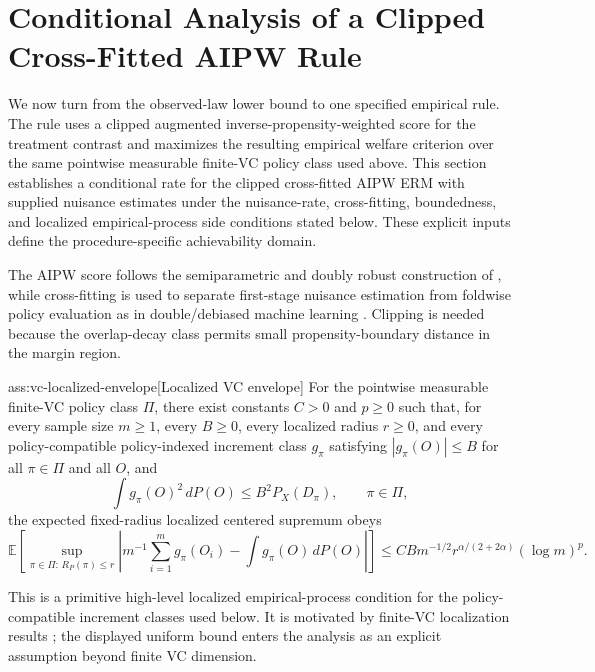 \section{Conditional Analysis of a Clipped Cross-Fitted AIPW Rule}

We now turn from the observed-law lower bound to one specified empirical rule.  The rule uses a clipped augmented inverse-propensity-weighted score for the treatment contrast and maximizes the resulting empirical welfare criterion over the same pointwise measurable finite-VC policy class used above.  This section establishes a conditional rate for the clipped cross-fitted AIPW ERM with supplied nuisance estimates under the nuisance-rate, cross-fitting, boundedness, and localized empirical-process side conditions stated below.  These explicit inputs define the procedure-specific achievability domain.

The AIPW score follows the semiparametric and doubly robust construction of \citet{Robins1994,Hahn1998,Hirano2003,VanDerLaan2011}, while cross-fitting is used to separate first-stage nuisance estimation from foldwise policy evaluation as in double/debiased machine learning \citep{Chernozhukov2018,Chernozhukov2022}.  Clipping is needed because the overlap-decay class permits small propensity-boundary distance in the margin region.

\begin{assumptionv}{ass:vc-localized-envelope}[Localized VC envelope]
For the pointwise measurable finite-VC policy class \(\Pi\), there exist constants \(C>0\) and \(p\ge0\) such that, for every sample size \(m\ge1\), every \(B\ge0\), every localized radius \(r\ge0\), and every policy-compatible policy-indexed increment class \(g_\pi\) satisfying \(|g_\pi(O)|\le B\) for all \(\pi\in\Pi\) and all \(O\), and
\[
\int g_\pi(O)^2\,dP(O) \le B^2 P_X(D_\pi),\qquad \pi\in\Pi,
\]
the expected fixed-radius localized centered supremum obeys
\[
\mathbb E\left[\sup_{\pi\in\Pi:\,R_P(\pi)\le r}\left|m^{-1}\sum_{i=1}^m g_\pi(O_i)-\int g_\pi(O)\,dP(O)\right|\right]
\le C B m^{-1/2} r^{\alpha/(2+2\alpha)}(\log m)^p .
\]
\end{assumptionv}

This is a primitive high-level localized empirical-process condition for the policy-compatible increment classes used below.  It is motivated by finite-VC localization results \citep{BartlettBousquetMendelson2005Local}; the displayed uniform bound enters the analysis as an explicit assumption beyond finite VC dimension.

